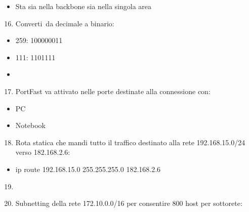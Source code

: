 \documentclass[
]{article}
\providecommand{\tightlist}{%
  \setlength{\itemsep}{0pt}\setlength{\parskip}{0pt}}
\begin{document}
\begin{itemize}
\tightlist
\item
  {Sta sia nella backbone sia nella singola area}
\end{itemize}

{}

\begin{enumerate}
\setcounter{enumi}{15}
\tightlist
\item
  {Converti}{~da decimale a binario:}
\end{enumerate}

\begin{itemize}
\tightlist
\item
  {259: }{100000011}
\item
  {111: }{1101111}
\item
  {}
\end{itemize}

{}

\begin{enumerate}
\setcounter{enumi}{16}
\tightlist
\item
  {PortFast va attivato nelle porte destinate alla connessione con:}
\end{enumerate}

\begin{itemize}
\tightlist
\item
  {PC}
\item
  {Notebook}
\end{itemize}

{}

\begin{enumerate}
\setcounter{enumi}{17}
\tightlist
\item
  {Rota statica che mandi tutto il traffico destinato alla rete
  192.168.15.0/24 verso 182.168.2.6:}
\end{enumerate}

\begin{itemize}
\tightlist
\item
  {ip route 192.168.15.0 255.255.255.0 182.168.2.6}
\end{itemize}

{}

\begin{enumerate}
\setcounter{enumi}{18}
\tightlist
\item
  {}
\end{enumerate}

{}

\begin{enumerate}
\setcounter{enumi}{19}
\tightlist
\item
  {Subnetting della rete 172.10.0.0/16 per consentire 800 host per
  sottorete:}
\end{enumerate}
\end{document}
